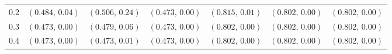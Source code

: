 \begin{table}[t]
{\begin{tabular}{@{}c*{6}{c}@{}}
0.2
& \((0.484,\,0.04)\)
& \((0.506,\,0.24)\)
& \((0.473,\,0.00)\)
& \((0.815,\,0.01)\)
& \((0.802,\,0.00)\)
& \((0.802,\,0.00)\)
\\

0.3
& \((0.473,\,0.00)\)
& \((0.479,\,0.06)\)
& \((0.473,\,0.00)\)
& \((0.802,\,0.00)\)
& \((0.802,\,0.00)\)
& \((0.802,\,0.00)\)
\\

0.4
& \((0.473,\,0.00)\)
& \((0.473,\,0.01)\)
& \((0.473,\,0.00)\)
& \((0.802,\,0.00)\)
& \((0.802,\,0.00)\)
& \((0.802,\,0.00)\)
\\

\bottomrule
\end{tabular}
}

\end{table}

